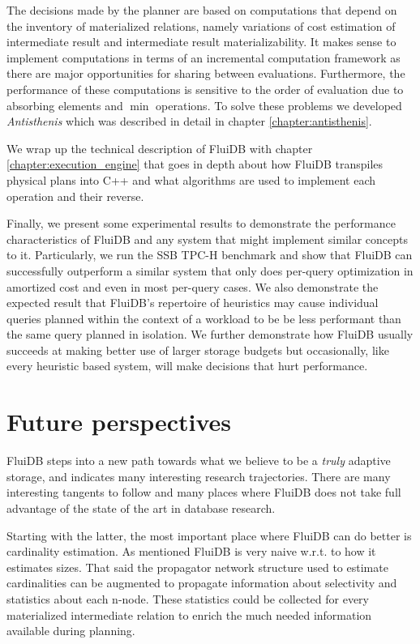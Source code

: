 The decisions made by the planner are based on computations that
depend on the inventory of materialized relations, namely
variations of cost estimation of intermediate result and intermediate
result materializability. It makes sense to implement computations in
terms of an incremental computation framework as there are major
opportunities for sharing between evaluations. Furthermore, the
performance of these computations is sensitive to the order of
evaluation due to absorbing elements and \(\min\) operations. To solve
these problems we developed \emph{Antisthenis} which was described in
detail in chapter \ref{chapter:antisthenis}.

We wrap up the technical description of FluiDB with chapter
\ref{chapter:execution_engine} that goes in depth about how FluiDB
transpiles physical plans into C++ and what algorithms are used to
implement each operation and their reverse.

Finally, we present some experimental results to demonstrate the
performance characteristics of FluiDB and any system that might
implement similar concepts to it. Particularly, we run the SSB TPC-H
benchmark and show that FluiDB can successfully outperform a similar
system that only does per-query optimization in amortized cost and
even in most per-query cases. We also demonstrate the expected result
that FluiDB's repertoire of heuristics may cause individual queries
planned within the context of a workload to be be less performant than
the same query planned in isolation. We further demonstrate how FluiDB
usually succeeds at making better use of larger storage budgets but
occasionally, like every heuristic based system, will make decisions
that hurt performance.

\section{Future perspectives}

FluiDB steps into a new path towards what we believe to be a
\emph{truly} adaptive storage, and indicates many interesting research
trajectories. There are many interesting tangents to follow and many
places where FluiDB does not take full advantage of the state of the
art in database research.

Starting with the latter, the most important place where FluiDB can do
better is cardinality estimation. As mentioned FluiDB is very naive
w.r.t. to how it estimates sizes. That said the propagator network
structure used to estimate cardinalities can be augmented to propagate
information about selectivity and statistics about each n-node. These
statistics could be collected for every materialized intermediate
relation to enrich the much needed information available during
planning.

